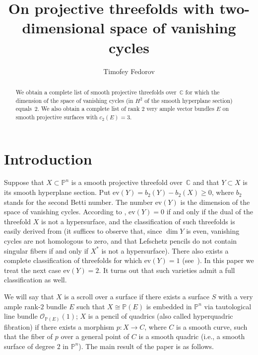 \documentclass[a4paper]{amsart}
\theoremstyle{plain}
\theoremstyle{definition}
\begin{document}
\title[On projective $3$-folds with two-dimensional space of vanishing
cycles]{On projective threefolds with two-dimensional space of vanishing
cycles}
\author{Timofey Fedorov}
\address{National Research University Higher School of Economics, Moscow, \mbox{Russia}.}
\begin{abstract}
We obtain a complete list of smooth projective threefolds
over~$\mathbb C$ for which the dimension of the space of vanishing
cycles (in $H^2$ of the smooth hyperplane section) equals~$2$.
We also obtain a complete list of rank $2$ very ample vector bundles $E$ on smooth projective surfaces with $c_2(E) = 3$.
\end{abstract}
\maketitle
\section{Introduction}
Suppose that $X\subset \mathbb P^n$ is a smooth projective threefold
over~$\mathbb C$ and that $Y\subset X$ is its smooth hyperplane
section. Put $\mathrm{ev}(Y)=b_2(Y)-b_2(X)\ge 0$, where $b_2$ stands
for the second Betti number. The number $\mathrm{ev}(Y)$ is the
dimension of the space of vanishing cycles. According to \cite[Expos\'e XIX]{sga}, $\mathrm{ev}(Y)=0$ if and only if the dual of the threefold $X$ is not a hypersurface, and the classification of such threefolds is easily derived from \cite[Corollary 3.2]{Ein}
(it suffices to observe that, since $\dim Y$ is even, vanishing cycles are not homologous to zero, and that Lefschetz pencils do not contain singular fibers if and only if $X^*$ is not a hypersurface).
 There also exists a complete
classification of threefolds for which $\mathrm{ev}(Y)=1$
(see~\cite[Theorem 1.1]{Lvovski}). In this paper we treat the
next case $\mathrm{ev}(Y)=2$. It turns out that such varieties admit a
full classification as well.

We will say that $X$ is a scroll over a surface if
    there exists a surface $S$ with a very ample rank-$2$ bundle $E$ such that $X \cong \mathbb P(E)$ is embedded in $\mathbb P^n$ via tautological line bundle $\mathcal O_{\mathbb P(E)}(1)$;
    $X$ is a pencil of quadrics (also called hyperquadric fibration) if there exists a morphism $p\colon X \to C$,
    where $C$ is a smooth curve, such that the fiber of $p$ over a general
    point of $C$ is a smooth quadric (i.e., a smooth surface of degree $2$
    in $\mathbb P^n$).
The main result of the paper is
as follows.
\end{document}
